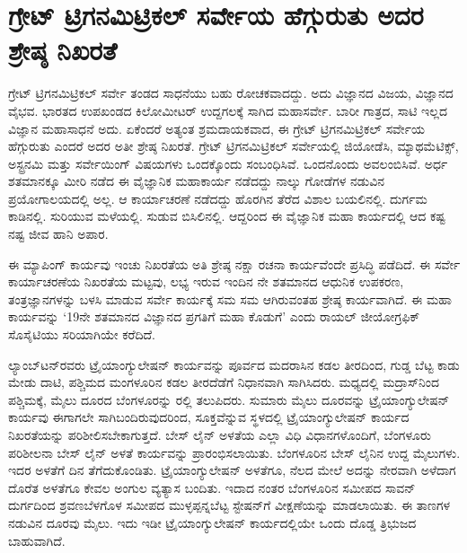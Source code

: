 
\chapter{ಗ್ರೇಟ್​ ಟ್ರಿಗನಮಿಟ್ರಿಕಲ್​ ಸರ್ವೇಯ ಹೆಗ್ಗುರುತು ಅದರ ಶ್ರೇಷ್ಠ ನಿಖರತೆ}

\vskip -8pt

ಗ್ರೇಟ್​ ಟ್ರಿಗನಮಿಟ್ರಿಕಲ್​ ಸರ್ವೇ ತಂಡದ ಸಾಧನೆಯು ಬಹು ರೋಚಕವಾದದ್ದು. ಅದು ವಿಜ್ಞಾನದ ವಿಜಯ, ವಿಜ್ಞಾನದ ವೈಭವ. ಭಾರತದ ಉಪಖಂಡದ  ಕಿಲೋಮೀಟರ್​ ಉದ್ದಗಲಕ್ಕೆ ಸಾಗಿದ ಮಹಾಸರ್ವೇ. ಬಾರೀ ಗಾತ್ರದ, ಸಾಟಿ ಇಲ್ಲದ ವಿಜ್ಞಾನ ಮಹಾಸಾಧನೆ ಅದು. ಏಕೆಂದರೆ ಅತ್ಯಂತ ಶ್ರಮದಾಯಕವಾದ, ಈ ಗ್ರೇಟ್​ ಟ್ರಿಗನಮಿಟ್ರಿಕಲ್​ ಸರ್ವೇಯ ಹೆಗ್ಗುರುತು ಎಂದರೆ ಅದರ ಅತೀ ಶ್ರೇಷ್ಠ ನಿಖರತೆ. ಗ್ರೇಟ್​ ಟ್ರಿಗನಮಿಟ್ರಿಕಲ್​ ಸರ್ವೇಯಲ್ಲಿ ಜಿಯೋಡೆಸಿ, ಮ್ಯಾಥಮೆಟಿಕ್ಸ್​, ಅಸ್ಟ್ರನಮಿ ಮತ್ತು ಸರ್ವೇಯಿಂಗ್​ ವಿಷಯಗಳು ಒಂದಕ್ಕೊಂದು ಸಂಬಂಧಿಸಿವೆ. ಒಂದನೊಂದು ಅವಲಂಬಿಸಿವೆ. ಅರ್ಧ ಶತಮಾನಕ್ಕೂ ಮೀರಿ ನಡೆದ ಈ ವೈಜ್ಞಾನಿಕ ಮಹಾಕಾರ್ಯ ನಡೆದದ್ದು ನಾಲ್ಕು ಗೋಡೆಗಳ ನಡುವಿನ ಪ್ರಯೋಗಾಲಯದಲ್ಲಿ ಅಲ್ಲ. ಆ ಕಾರ್ಯಾಚರಣೆ ನಡೆದದ್ದು ಹೊರಗಿನ ತೆರೆದ ವಿಶಾಲ ಬಯಲಿನಲ್ಲಿ. ದುರ್ಗಮ ಕಾಡಿನಲ್ಲಿ. ಸುರಿಯುವ ಮಳೆಯಲ್ಲಿ. ಸುಡುವ ಬಿಸಿಲಿನಲ್ಲಿ. ಆದ್ದರಿಂದ ಈ ವೈಜ್ಞಾನಿಕ ಮಹಾ ಕಾರ್ಯದಲ್ಲಿ ಆದ ಕಷ್ಟ ನಷ್ಟ ಜೀವ ಹಾನಿ ಅಪಾರ.

ಈ ಮ್ಯಾಪಿಂಗ್​ ಕಾರ್ಯವು ಇಂಚು ನಿಖರತೆಯ ಅತಿ ಶ್ರೇಷ್ಠ ನಕ್ಷಾ ರಚನಾ ಕಾರ್ಯವೆಂದೇ ಪ್ರಸಿದ್ಧಿ ಪಡೆದಿದೆ. ಈ ಸರ್ವೇ ಕಾರ್ಯಾಚರಣೆಯ ನಿಖರತೆಯ ಮಟ್ಟವು, ಲಭ್ಯ ಇರುವ ಇಂದಿನ ನೇ ಶತಮಾನದ ಆಧುನಿಕ ಉಪಕರಣ, ತಂತ್ರಜ್ಞಾನಗಳನ್ನು ಬಳಸಿ ಮಾಡುವ ಸರ್ವೇ ಕಾರ್ಯಕ್ಕೆ ಸಮ ಸಮ ಆಗಿರುವಂತಹ ಶ್ರೇಷ್ಠ ಕಾರ್ಯವಾಗಿದೆ. ಈ ಮಹಾ ಕಾರ್ಯವನ್ನು ‘19ನೇ ಶತಮಾನದ ವಿಜ್ಞಾನದ ಪ್ರಗತಿಗೆ ಮಹಾ ಕೊಡುಗೆ’ ಎಂದು ರಾಯಲ್​ ಜೀಯೋಗ್ರಫಿಕ್​ ಸೊಸೈಟಿಯು ಸರಿಯಾಗಿಯೇ ಕರೆದಿದೆ.

ಲ್ಯಾಂಬ್​ಟನ್​ರವರು ಟ್ರೈಯಾಂಗ್ಯುಲೇಷನ್​ ಕಾರ್ಯವನ್ನು ಪೂರ್ವದ ಮದರಾಸಿನ ಕಡಲ ತೀರದಿಂದ, ಗುಡ್ಡ ಬೆಟ್ಟ ಕಾಡು ಮೇಡು ದಾಟಿ, ಪಶ್ಚಿಮದ ಮಂಗಳೂರಿನ ಕಡಲ ತೀರದೆಡೆಗೆ ನಿಧಾನವಾಗಿ ಸಾಗಿಸಿದರು. ಮಧ್ಯದಲ್ಲಿ ಮದ್ರಾಸ್​ನಿಂದ ಪಶ್ಚಿಮಕ್ಕೆ,  ಮೈಲು ದೂರದ ಬೆಂಗಳೂರನ್ನು  ರಲ್ಲಿ ತಲುಪಿದರು. ಸುಮಾರು  ಮೈಲು ದೂರವನ್ನು ಟ್ರೈಯಾಂಗ್ಯುಲೇಷನ್​ ಕಾರ್ಯವು ಈಗಾಗಲೇ ಸಾಗಿಬಂದಿರುವುದರಿಂದ, ಸೂಕ್ತವೆನ್ನುವ ಸ್ಥಳದಲ್ಲಿ ಟ್ರೈಯಾಂಗ್ಯುಲೇಷನ್​ ಕಾರ್ಯದ ನಿಖರತೆಯನ್ನು ಪರಿಶೀಲಿಸಬೇಕಾಗುತ್ತದೆ. ಬೇಸ್​ ಲೈನ್​ ಅಳತೆಯ ಎಲ್ಲಾ ವಿಧಿ ವಿಧಾನಗಳೊಂದಿಗೆ, ಬೆಂಗಳೂರು ಪರಿಶೀಲನಾ ಬೇಸ್​ ಲೈನ್​ ಅಳತೆ ಕಾರ್ಯವನ್ನು ಪ್ರಾರಂಭಿಸಲಾಯಿತು. ಬೆಂಗಳೂರಿನ ಬೇಸ್​ ಲೈನಿನ ಉದ್ದ  ಮೈಲುಗಳು. ಇದರ ಅಳತೆಗೆ  ದಿನ ತೆಗೆದುಕೊಂಡಿತು. ಟ್ರೈಯಾಂಗ್ಯುಲೇಷನ್​ ಅಳತೆಗೂ, ನೆಲದ ಮೇಲೆ ಅದನ್ನು ನೇರವಾಗಿ ಅಳೆದಾಗ ದೊರೆತ ಅಳತೆಗೂ ಕೇವಲ  ಅಂಗುಲ ವ್ಯತ್ಯಾಸ ಬಂದಿತು. ಇದಾದ ನಂತರ ಬೆಂಗಳೂರಿನ ಸಮೀಪದ ಸಾವನ್​ ದುರ್ಗದಿಂದ ಶ್ರವಣಬೆಳಗೊಳ ಸಮೀಪದ ಮುಳ್ಳಪ್ಪನ್ನಬೆಟ್ಟ ಸ್ಟೇಷನ್​ಗೆ ವೀಕ್ಷಣೆಯನ್ನು ಮಾಡಲಾಯಿತು. ಈ ತಾಣಗಳ ನಡುವಿನ ದೂರವು  ಮೈಲು. ಇದು ಇಡೀ ಟ್ರೈಯಾಂಗ್ಯುಲೇಷನ್​ ಕಾರ್ಯದಲ್ಲಿಯೇ ಒಂದು ದೊಡ್ಡ ತ್ರಿಭುಜದ ಬಾಹುವಾಗಿದೆ.

\vskip 5pt

